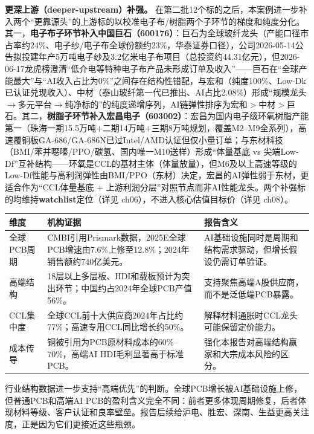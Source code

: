 \textbf{更深上游（deeper-upstream）补强。} 在第二批12个标的之后，本案例进一步补入两个“更靠源头”的上游标的以校准电子布/树脂两个子环节的梯度和纯度分化。其一，\textbf{电子布子环节补入中国巨石（600176）}：巨石为全球玻纤龙头（产能口径市占率约24\%、电子纱/电子布全球份额约23\%，华泰证券口径），公司2026-05-14公告拟投建年产5万吨电子纱及3.2亿米电子布项目（总投资约44.31亿元），但2026-06-17龙虎榜澄清“低介电等特种电子布产品未形成订单及收入”——巨石在“全球产能最大”与“AI收入占比为0\%”之间存在结构性错配，与宏和（纯度100\%、Low-Dk已认证兑现收入）、中材（泰山玻纤第一代已推出、AI占比2.08\%）形成“规模龙头$\to$多元平台$\to$纯净标的”的纯度递增序列，AI链弹性排序为宏和$>$中材$>$巨石。其二，\textbf{树脂子环节补入宏昌电子（603002）}：宏昌为国内电子级环氧树脂产能第一（珠海一期15.5万吨$+$二期14万吨$+$三期8万吨规划，覆盖M2--M9全系列），高速覆铜板GA-686/GA-686N已过Intel/AMD认证但仅小量订单；与东材科技（BMI/苯并噁嗪/PPO/碳氢、国内唯一M10送样）形成“体量基底 vs 尖端Low-Df”互补结构——环氧是CCL的基材主体（体量放量），但M6及以上高速等级的Low-Df性能与高利润弹性由BMI/PPO（东材）决定，宏昌的AI弹性弱于东材，更适合作为“CCL体量基底 + 上游利润分层”对照节点而非AI性能龙头。两个补强标的均维持\textbf{watchlist}定位（详见 ch06），不进入核心估值目标价（详见 ch08）。

\begin{exhibitbox}
\footnotesize
\begin{tabularx}{\textwidth}{L{2.6cm}X X}
\toprule
\textbf{维度} & \textbf{机构证据} & \textbf{报告含义} \\
\midrule
全球PCB周期 & CMBI引用Prismark数据，2025E全球PCB增速由7.6\%上修至12.8\%；2024年销售额约740亿美元。 & AI基础设施同时是周期和结构需求驱动，但增长假设仍需订单验证。 \\
高端结构 & 18层以上多层板、HDI和载板预计为突出环节；中国约占2024年全球PCB产值56\%。 & 支持聚焦高端A股供应商，而不是泛低端PCB暴露。 \\
CCL集中度 & 全球CCL前十大供应商2024年占比约77\%；高速专用CCL同比增长约50\%。 & 解释材料通胀时CCL龙头可能保留定价能力。 \\
成本传导 & 铜被引用为PCB原材料成本的60\%--70\%，高端AI HDI毛利显著高于标准PCB。 & 强化本报告对高端结构赢家和大宗成本风险的区分。 \\
\bottomrule
\end{tabularx}
\end{exhibitbox}

行业结构数据进一步支持“高端优先”的判断。全球PCB增长被AI基础设施上修，但普通PCB和高端AI PCB的盈利含义完全不同：前者更多体现周期修复，后者体现材料等级、客户认证和良率壁垒。报告后续给沪电、胜宏、深南、生益更高关注度，正是因为它们更接近这些瓶颈。

